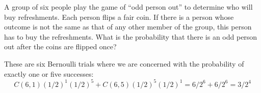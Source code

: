 \documentclass[../main.tex]{subfiles}
\begin{document}
A group of six people play the game of ``odd person out'' to determine who will buy refreshments.
Each person flips a fair coin.
If there is a person whose outcome is not the same as that of any other member of the group, this person has to buy the refreshments.
What is the probability that there is an odd person out after the coins are flipped once?

\solution
These are six Bernoulli trials where we are concerned with the probability of exactly one or five successes:
\[
	C(6, 1)(1/2)^1(1/2)^5
	+
	C(6, 5)(1/2)^5(1/2)^1
	= 
	6/2^6
	+
	6/2^6
	=
	3/2^4
\]
\end{document}
